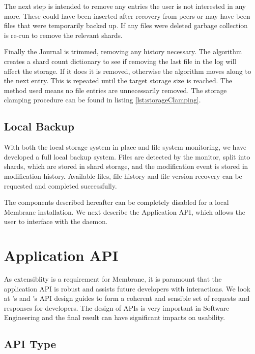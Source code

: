 \documentclass[11pt, a4paper, twocolumn, twoside]{report}
\begin{document}
The next step is intended to remove any entries the user is not interested in any more. These could have been inserted after recovery from peers or may have been files that were temporarily backed up. If any files were deleted garbage collection is re-run to remove the relevant shards.

Finally the Journal is trimmed, removing any history necessary. The algorithm creates a shard count dictionary to see if removing the last file in the log will affect the storage. If it does it is removed, otherwise the algorithm moves along to the next entry. This is repeated until the target storage size is reached. The method used means no file entries are unnecessarily removed. The storage clamping procedure can be found in listing \ref{lst:storageClamping}.

\subsection{Local Backup}

With both the local storage system in place and file system monitoring, we have developed a full local backup system. Files are detected by the monitor, split into shards, which are stored in shard storage, and the modification event is stored in modification history. Available files, file history and file version recovery can be requested and completed successfully.

The components described hereafter can be completely disabled for a local Membrane installation. We next describe the Application API, which allows the user to interface with the daemon.

\section{Application API}

As extensiblity is a requirement for Membrane, it is paramount that the application API is robust and assists future developers with interactions. We look at \cite{google2017api}'s and \cite{heroku2017api}'s API design guides to form a coherent and sensible set of requests and responses for developers. The design of APIs is very important in Software Engineering and the final result can have significant impacts on usability. \citep{benslimane2008services} 

\subsection{API Type}
\end{document}

